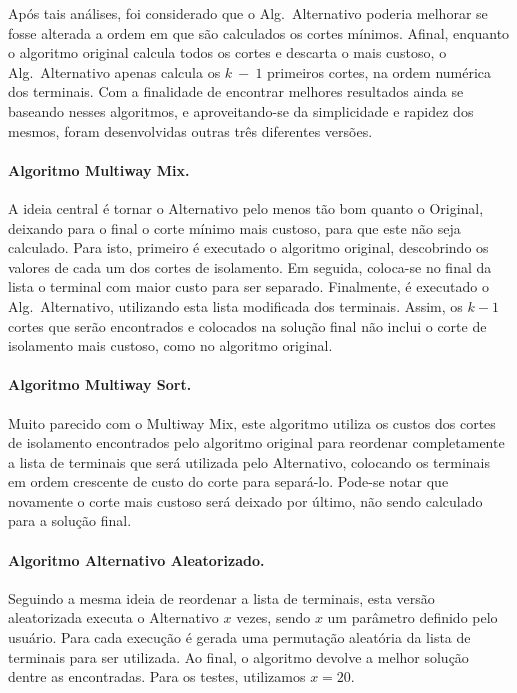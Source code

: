 \documentclass[12pt, a4paper]{article}
\begin{document}
Após tais análises, foi considerado que o Alg.\ Alternativo poderia melhorar se fosse alterada a ordem em que são calculados os cortes mínimos. Afinal, enquanto o algoritmo original calcula todos os cortes e descarta o mais custoso, o Alg.\ Alternativo apenas calcula os $k~-~1$ primeiros cortes, na ordem numérica dos terminais.
Com a finalidade de encontrar melhores resultados ainda se baseando nesses algoritmos, e aproveitando-se da simplicidade e rapidez dos mesmos, foram desenvolvidas outras três diferentes versões.

\paragraph{Algoritmo Multiway Mix.} A ideia central é tornar o Alternativo pelo menos tão bom quanto o Original, deixando para o final o corte mínimo mais custoso, para que este não seja calculado. Para isto, primeiro é executado o algoritmo original, descobrindo os valores de cada um dos cortes de isolamento. Em seguida, coloca-se no final da lista o terminal com maior custo para ser separado. Finalmente, é executado o Alg.\ Alternativo, utilizando esta lista modificada dos terminais. Assim, os $k-1$ cortes que serão encontrados e colocados na solução final não inclui o corte de isolamento mais custoso, como no algoritmo original.

\paragraph{Algoritmo Multiway Sort.} Muito parecido com o Multiway Mix, este algoritmo utiliza os custos dos cortes de isolamento encontrados pelo algoritmo original para reordenar completamente a lista de terminais que será utilizada pelo Alternativo, colocando os terminais em ordem crescente de custo do corte para separá-lo. Pode-se notar que novamente o corte mais custoso será deixado por último, não sendo calculado para a solução final. 


\paragraph{Algoritmo Alternativo Aleatorizado.} Seguindo a mesma ideia de reordenar a lista de terminais, esta versão aleatorizada executa o Alternativo $x$ vezes, sendo $x$ um parâmetro definido pelo usuário. Para cada execução é gerada uma permutação aleatória da lista de terminais para ser utilizada. Ao final, o algoritmo devolve a melhor solução dentre as encontradas. Para os testes, utilizamos $x=20$.
\end{document}
